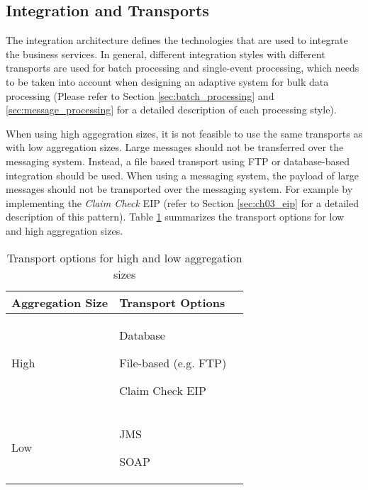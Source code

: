 \subsection{Integration and Transports}
\label{sec:ch05_transports}
The integration architecture defines the technologies that are used to integrate the business services. In general, different integration styles with different transports are used for batch processing and single-event processing, which needs to be taken into account when designing an adaptive system for bulk data processing (Please refer to Section \ref{sec:batch_processing} and \ref{sec:message_processing} for a detailed description of each processing style).

When using high aggegration sizes, it is not feasible to use the same transports as with low aggregation sizes. Large messages should not be transferred over the messaging system. Instead, a file based transport using \ac{FTP} or database-based integration should be used. When using a messaging system, the payload of large messages should not be transported over the messaging system. For example by implementing the \emph{Claim Check} \ac{EIP} (refer to Section \ref{sec:ch03_eip} for a detailed description of this pattern). Table \ref{table:ch05_transports} summarizes the transport options for low and high aggregation sizes.

\begin{table}[htbp]
	\centering
	\begin{tabularx}{\textwidth}{@{} X X X @{}}
		\caption{Transport options for high and low aggregation sizes}\label{table:ch05_transports}\\
		\toprule
		\bfseries Aggregation Size & \bfseries Transport Options\\
		\midrule
		High & \savespace
		\begin{titemize}
			\item Database
			\item File-based (e.g. \ac{FTP})
			\item Claim Check \ac{EIP}
		\end{titemize}\\
		\midrule
		Low & \savespace
		\begin{titemize}
			\item \ac{JMS}
			\item SOAP
		\end{titemize}\\
		\bottomrule
	\end{tabularx}
\end{table}

